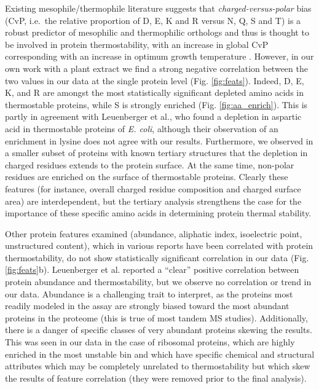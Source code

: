 \documentclass[11pt,letter]{article}\usepackage[]{graphicx}\usepackage[]{color}
\begin{document}
Existing mesophile/thermophile literature suggests that
\textit{charged-versus-polar} bias (CvP, i.e.\ the relative proportion of D,
E, K and R versus N, Q, S and T) is a robust predictor of mesophilic and
thermophilic orthologs and thus is thought to be involved in protein
thermostability, with an increase in global CvP corresponding with an increase
in optimum growth temperature \cite{suhre_genomic_2003}. However, in our own
work with a plant extract we find a strong negative correlation between the
two values in our data at the single protein level (Fig. \ref{fig:feats}).
Indeed, D, E, K, and R are amongst the most statistically significant depleted
amino acids in thermostable proteins, while S is strongly enriched (Fig.
\ref{fig:aa_enrich}). This is partly in agreement with Leuenberger et al., who
found a depletion in aspartic acid in thermostable proteins of \textit{E.
coli}, although their observation of an enrichment in lysine does not agree
with our results. Furthermore, we observed in a smaller subset of proteins
with known tertiary structures that the depletion in charged residues extends
to the protein surface. At the same time, non-polar residues are enriched on
the surface of thermostable proteins. Clearly these features (for instance,
overall charged residue composition and charged surface area) are
interdependent, but the tertiary analysis strengthens the case for the
importance of these specific amino acids in determining protein thermal
stability.

Other protein features examined (abundance, aliphatic index, isoelectric
point, unstructured content), which in various reports have been correlated
with protein thermostability, do not show statistically significant
correlation in our data (Fig. \ref{fig:feats}b). Leuenberger et al. reported a
``clear'' positive correlation between protein abundance and thermostability,
but we observe no correlation or trend in our data. Abundance is a challenging
trait to interpret, as the proteins most readily modeled in the assay are
strongly biased toward the most abundant proteins in the proteome (this is
true of most tandem MS studies). Additionally, there is a danger of specific
classes of very abundant proteins skewing the results. This was seen in our
data in the case of ribosomal proteins, which are highly enriched in the most
unstable bin and which have specific chemical and structural attributes which
may be completely unrelated to thermostability but which skew the results of
feature correlation (they were removed prior to the final analysis).
\end{document}
